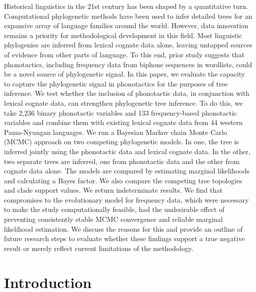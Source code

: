 Historical linguistics in the 21st century has been shaped by a quantitative turn. Computational phylogenetic methods have been used to infer detailed trees for an expansive array of language families around the world. However, data innovation remains a priority for methodological development in this field. Most linguistic phylogenies are inferred from lexical cognate data alone, leaving untapped sources of evidence from other parts of language. To this end, prior study suggests that phonotactics, including frequency data from biphone sequences in wordlists, could be a novel source of phylogenetic signal. In this paper, we evaluate the capacity to capture the phylogenetic signal in phonotactics for the purposes of tree inference. We test whether the inclusion of phonotactic data, in conjunction with lexical cognate data, can strengthen phylogenetic tree inference. To do this, we take 2,236 binary phonotactic variables and 133 frequency-based phonotactic variables and combine them with existing lexical cognate data from 44 western Pama-Nyungan languages. We run a Bayesian Markov chain Monte Carlo (MCMC) approach on two competing phylogenetic models. In one, the tree is inferred jointly using the phonotactic data and lexical cognate data. In the other, two separate trees are inferred, one from phonotactic data and the other from cognate data alone. The models are compared by estimating marginal likelihoods and calculating a Bayes factor. We also compare the competing tree topologies and clade support values. We return indeterminate results. We find that compromises to the evolutionary model for frequency data, which were necessary to make the study computationally feasible, had the undesirable effect of preventing consistently stable MCMC convergence and reliable marginal likelihood estimation. We discuss the reasons for this and provide an outline of future research steps to evaluate whether these findings support a true negative result or merely reflect current limitations of the methodology.

\hypertarget{pn-tree-intro}{%
\section{Introduction}\label{pn-tree-intro}}

